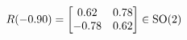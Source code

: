 \documentclass[preview]{standalone}
\begin{document}
\begin{align*}
\special{dvisvgm:raw <g id='unique000'>}R(-0.90) = \begin{bmatrix} 0.62 & 0.78 \\ -0.78 & 0.62 \end{bmatrix} \in \text{SO}(2)\special{dvisvgm:raw </g>}
\end{align*}
\end{document}

